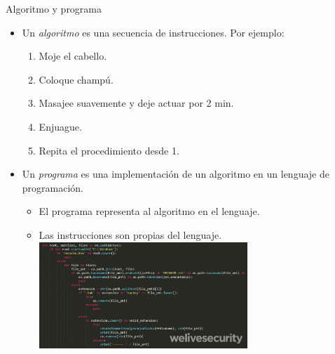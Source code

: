 \documentclass{beamer}
\begin{document}
\begin{frame}{Algoritmo y programa}
\begin{itemize}
	\item Un \emph{algoritmo} es una secuencia de instrucciones. Por ejemplo:\pause
	\begin{enumerate}
		\item Moje el cabello.%
		\item Coloque champú.%
		\item Masajee suavemente y deje actuar por 2 min.%
		\item Enjuague.
		\item Repita el procedimiento desde 1.
	\end{enumerate}\pause
	\item Un \emph{programa} es una implementación de un algoritmo en un lenguaje de programación. \pause
	\begin{itemize}
		\item El programa representa al algoritmo en el lenguaje. \pause
		\item Las instrucciones son propias del lenguaje.
		\includegraphics[height=4cm]{pythonCode.png}
	\end{itemize}
\end{itemize}

\end{frame}
\end{document}
